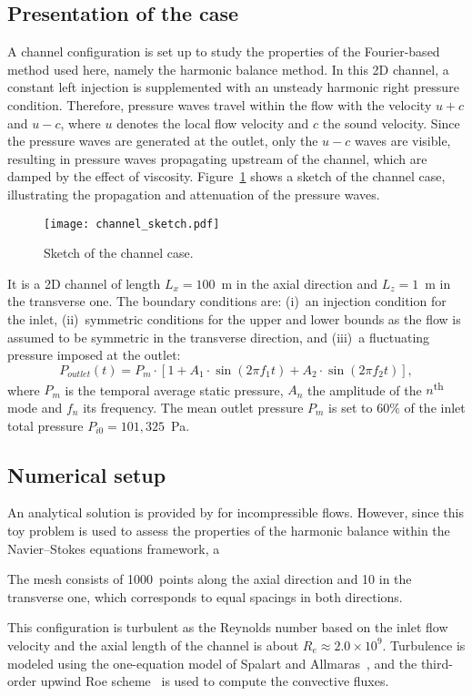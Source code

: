 \subsection{Presentation of the case}
\label{sub:presentation_of_the_case}

A channel configuration is set up to study the properties of the
Fourier-based method used here, namely the harmonic balance
method. In this 2D channel, a constant left injection is 
supplemented with an unsteady harmonic right pressure condition.
Therefore, pressure waves travel within the flow with the velocity $u + c$ and $u
- c$, where $u$ denotes the local flow velocity and $c$ the sound
velocity. Since the pressure waves are generated at the outlet, only
the $u-c$ waves are visible, resulting in pressure waves propagating
upstream of the channel, which are damped by the effect of
viscosity. Figure~\ref{fig:canal_principle} shows a sketch
of the channel case, illustrating the propagation and attenuation of
the pressure waves.
\begin{figure}[htb]
  \centering
  \texttt{[image: channel\_sketch.pdf]}
  \caption{Sketch of the channel case.}
  \label{fig:canal_principle}
\end{figure}

It is a 2D channel of length $L_x = 100$~m in the axial
direction and $L_z = 1$~m in the transverse one.  The boundary
conditions are: (i)~an injection condition for the inlet,
(ii)~symmetric conditions for the upper and lower bounds as the flow
is assumed to be symmetric in the transverse direction, and (iii)~a
fluctuating pressure imposed at the outlet:
\begin{equation}
  P_{outlet}(t) = P_m \cdot \left[1 + A_1 \cdot \sin(2 \pi f_1 t) +
    A_2 \cdot \sin(2 \pi f_2 t) \right],
  \label{eq:outlet_canal}
\end{equation}
where $P_m$ is the temporal average static pressure, $A_n$ the
amplitude of the $n$\textsuperscript{th} mode and $f_n$ its
frequency. The mean outlet pressure $P_m$ is set to $60\%$ of the
inlet total pressure $P_{i0} = 101,325$~Pa.

\subsection{Numerical setup}

An analytical solution is provided by \citet{Merkle1987} for
incompressible flows. However, since this toy problem is used
to assess the properties of the harmonic balance within
the Navier--Stokes equations framework, a 


The mesh consists of 1000~points along the axial direction and 10 in the
transverse one, which corresponds to equal spacings in both
directions.

This configuration is turbulent as the Reynolds number based on the
inlet flow velocity and the axial length of the channel is about $R_e
\approx 2.0 \times 10^9$.  Turbulence is modeled using the
one-equation model of Spalart and Allmaras~\cite{Spalart1992}, and the
third-order upwind Roe scheme~\cite{Roe1981} is used to compute the
convective fluxes.